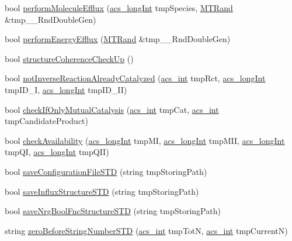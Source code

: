 \begin{DoxyCompactItemize}
\item 
bool \hyperlink{classenvironment_ad072a40a7d9521379c7ff50ed8110fbe}{perform\-Molecule\-Efflux} (\hyperlink{acs__headers_8h_a19319d75f02db4308bc5c0026d98cd85}{acs\-\_\-long\-Int} tmp\-Species, \hyperlink{class_m_t_rand}{M\-T\-Rand} \&tmp\-\_\-\-\_\-\-Rnd\-Double\-Gen)
\item 
bool \hyperlink{classenvironment_aff7607e0f3a74790109a7d87de3031bd}{perform\-Energy\-Efflux} (\hyperlink{class_m_t_rand}{M\-T\-Rand} \&tmp\-\_\-\-\_\-\-Rnd\-Double\-Gen)
\item 
bool \hyperlink{classenvironment_a6606b08f25751a8796c13810962b385e}{structure\-Coherence\-Check\-Up} ()
\item 
bool \hyperlink{classenvironment_a5160dec152ed0369fe8af9aff3253a9e}{not\-Inverse\-Reaction\-Already\-Catalyzed} (\hyperlink{acs__headers_8h_a8d277355641a098190360234e2ebde35}{acs\-\_\-int} tmp\-Rct, \hyperlink{acs__headers_8h_a19319d75f02db4308bc5c0026d98cd85}{acs\-\_\-long\-Int} tmp\-I\-D\-\_\-\-I, \hyperlink{acs__headers_8h_a19319d75f02db4308bc5c0026d98cd85}{acs\-\_\-long\-Int} tmp\-I\-D\-\_\-\-I\-I)
\item 
bool \hyperlink{classenvironment_abdafaeba15b5d32fd35569869c6244d5}{check\-If\-Only\-Mutual\-Catalysis} (\hyperlink{acs__headers_8h_a8d277355641a098190360234e2ebde35}{acs\-\_\-int} tmp\-Cat, \hyperlink{acs__headers_8h_a8d277355641a098190360234e2ebde35}{acs\-\_\-int} tmp\-Candidate\-Product)
\item 
bool \hyperlink{classenvironment_ad3ebcd7ab1c9ba1a0f65b264b97adf33}{check\-Availability} (\hyperlink{acs__headers_8h_a19319d75f02db4308bc5c0026d98cd85}{acs\-\_\-long\-Int} tmp\-M\-I, \hyperlink{acs__headers_8h_a19319d75f02db4308bc5c0026d98cd85}{acs\-\_\-long\-Int} tmp\-M\-I\-I, \hyperlink{acs__headers_8h_a19319d75f02db4308bc5c0026d98cd85}{acs\-\_\-long\-Int} tmp\-Q\-I, \hyperlink{acs__headers_8h_a19319d75f02db4308bc5c0026d98cd85}{acs\-\_\-long\-Int} tmp\-Q\-I\-I)
\item 
bool \hyperlink{classenvironment_a71f4c5ff1c11a9d61cbc818682a4a91e}{save\-Configuration\-File\-S\-T\-D} (string tmp\-Storing\-Path)
\item 
bool \hyperlink{classenvironment_a8f831e2db11fa5d840484345dac64fc7}{save\-Influx\-Structure\-S\-T\-D} (string tmp\-Storing\-Path)
\item 
bool \hyperlink{classenvironment_a1412b9b1c3bd3e42bcb481f5e18ea931}{save\-Nrg\-Bool\-Fnc\-Structure\-S\-T\-D} (string tmp\-Storing\-Path)
\item 
string \hyperlink{classenvironment_a8699a0f85f5e8dc23eb8f78fa22c6b17}{zero\-Before\-String\-Number\-S\-T\-D} (\hyperlink{acs__headers_8h_a8d277355641a098190360234e2ebde35}{acs\-\_\-int} tmp\-Tot\-N, \hyperlink{acs__headers_8h_a8d277355641a098190360234e2ebde35}{acs\-\_\-int} tmp\-Current\-N)

\end{DoxyCompactItemize}
